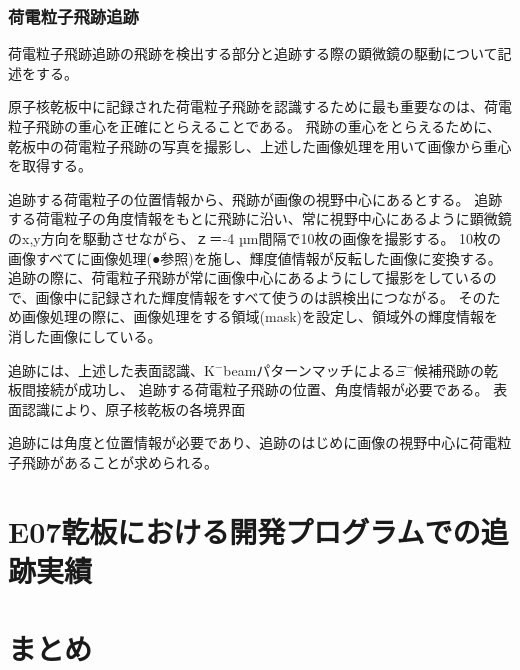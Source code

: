 \documentclass[12pt,a4paper]{jarticle}
\begin{document}
\subsubsection{荷電粒子飛跡追跡}
荷電粒子飛跡追跡の飛跡を検出する部分と追跡する際の顕微鏡の駆動について記述をする。
\par
原子核乾板中に記録された荷電粒子飛跡を認識するために最も重要なのは、荷電粒子飛跡の重心を正確にとらえることである。
飛跡の重心をとらえるために、乾板中の荷電粒子飛跡の写真を撮影し、上述した画像処理を用いて画像から重心を取得する。
\par
追跡する荷電粒子の位置情報から、飛跡が画像の視野中心にあるとする。
追跡する荷電粒子の角度情報をもとに飛跡に沿い、常に視野中心にあるように顕微鏡のx,y方向を駆動させながら、ｚ＝-4 µm間隔で10枚の画像を撮影する。
10枚の画像すべてに画像処理(●参照)を施し、輝度値情報が反転した画像に変換する。
追跡の際に、荷電粒子飛跡が常に画像中心にあるようにして撮影をしているので、画像中に記録された輝度情報をすべて使うのは誤検出につながる。
そのため画像処理の際に、画像処理をする領域(mask)を設定し、領域外の輝度情報を消した画像にしている。
\par
追跡には、上述した表面認識、K$^-$beamパターンマッチによる$\Xi$$^-$候補飛跡の乾板間接続が成功し、
追跡する荷電粒子飛跡の位置、角度情報が必要である。
表面認識により、原子核乾板の各境界面
\par
追跡には角度と位置情報が必要であり、追跡のはじめに画像の視野中心に荷電粒子飛跡があることが求められる。





\newpage
\section{E07乾板における開発プログラムでの追跡実績}

\newpage
\section{まとめ}
\end{document}
